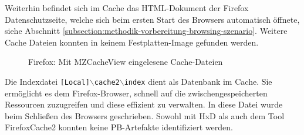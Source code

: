 \begin{appendices}
{
}
\restoregeometry
%


Weiterhin befindet sich im Cache das HTML-Dokument der Firefox Datenschutzseite, welche sich beim ersten Start des Browsers automatisch öffnete, siehe Abschnitt \ref{subsection:methodik-vorbereitung-browsing-szenario}.
Weitere Cache Dateien konnten in keinem Festplatten-Image gefunden werden.
\begin{figure}[h!]
	\caption{Firefox: Mit MZCacheView eingelesene Cache-Dateien}
	\label{img:mzcacheview}
\end{figure}
Die Indexdatei \texttt{[Local]$\backslash$cache2$\backslash$index} dient als Datenbank im Cache. Sie ermöglicht es dem Firefox-Browser, schnell auf die zwischengespeicherten Ressourcen zuzugreifen und diese effizient zu verwalten. In diese Datei wurde beim Schließen des Browsers geschrieben. Sowohl mit HxD als auch dem Tool FirefoxCache2 konnten keine PB-Artefakte identifiziert werden.


\end{appendices}

